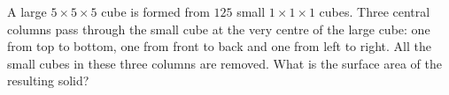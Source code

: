 A large $5\times5\times5$ cube is formed from $125$ small $1\times1\times1$ cubes. Three central columns pass through the small cube at the very centre of the large cube: one from top to bottom, one from front to back and one from left to right. All the small cubes in these three columns are removed. What is the surface area of the resulting solid?
